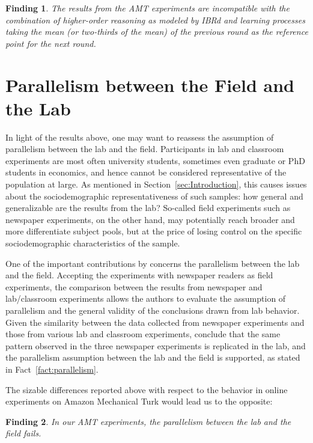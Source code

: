 \documentclass[12pt,review]{elsarticle}
\newtheorem{fdn}{Finding}
\begin{document}
\begin{fdn}
The results from the AMT experiments are incompatible with the combination of higher-order reasoning as modeled by IBRd and learning processes taking the mean (or two-thirds of the mean) of the previous round as the reference point for the next round. 
\end{fdn}

\section{Parallelism between the Field and the Lab\label{sec:Parallelism}}
\noindent
In light of the results above, one may want to reassess the assumption
of parallelism between the lab and the field. Participants in lab
and classroom experiments are most often university students, sometimes
even graduate or PhD students in economics, and hence cannot be considered
representative of the population at large. As mentioned in Section~\ref{sec:Introduction},
this causes issues about the sociodemographic representativeness of
such samples: how general and generalizable are the results from the
lab? So-called field experiments such as newspaper experiments, on
the other hand, may potentially reach broader and more differentiate
subject pools, but at the price of losing control on the specific
sociodemographic characteristics of the sample.

One of the important contributions by \citet{NagelEtAl02} concerns
the parallelism between the lab and the field. Accepting the experiments
with newspaper readers as field experiments, the comparison between
the results from newspaper and lab/classroom experiments allows the
authors to evaluate the assumption of parallelism and the general
validity of the conclusions drawn from lab behavior. Given the similarity
between the data collected from newspaper experiments and those from
various lab and classroom experiments, \citet{NagelEtAl02} conclude
that the same pattern observed in the three newspaper experiments
is replicated in the lab, and the parallelism assumption between the
lab and the field is supported, as stated in Fact~\ref{fact:parallelism}.

The sizable differences reported above with respect to the behavior
in online experiments on Amazon Mechanical Turk would lead us to the
opposite: 

\begin{fdn}
In our AMT experiments, the parallelism between the lab and the field fails.
\end{fdn}
\end{document}
